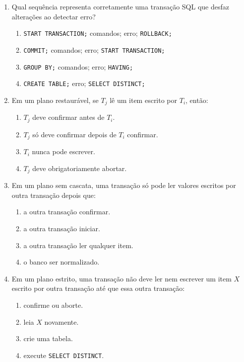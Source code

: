 \documentclass[12pt,a4paper]{article}
\begin{document}
\begin{enumerate}[resume,label=\textbf{Q\arabic*.}]
\item Qual sequência representa corretamente uma transação SQL que desfaz alterações ao detectar erro?

\begin{enumerate}[label=\alph*)]
    \item \texttt{START TRANSACTION;} comandos; erro; \texttt{ROLLBACK;}
    \item \texttt{COMMIT;} comandos; erro; \texttt{START TRANSACTION;}
    \item \texttt{GROUP BY;} comandos; erro; \texttt{HAVING;}
    \item \texttt{CREATE TABLE;} erro; \texttt{SELECT DISTINCT;}
\end{enumerate}

\item Em um plano restaurável, se $T_j$ lê um item escrito por $T_i$, então:

\begin{enumerate}[label=\alph*)]
    \item $T_j$ deve confirmar antes de $T_i$.
    \item $T_j$ só deve confirmar depois de $T_i$ confirmar.
    \item $T_i$ nunca pode escrever.
    \item $T_j$ deve obrigatoriamente abortar.
\end{enumerate}

\item Em um plano sem cascata, uma transação só pode ler valores escritos por outra transação depois que:

\begin{enumerate}[label=\alph*)]
    \item a outra transação confirmar.
    \item a outra transação iniciar.
    \item a outra transação ler qualquer item.
    \item o banco ser normalizado.
\end{enumerate}

\item Em um plano estrito, uma transação não deve ler nem escrever um item $X$ escrito por outra transação até que essa outra transação:

\begin{enumerate}[label=\alph*)]
    \item confirme ou aborte.
    \item leia $X$ novamente.
    \item crie uma tabela.
    \item execute \texttt{SELECT DISTINCT}.
\end{enumerate}


\end{enumerate}
\end{document}
